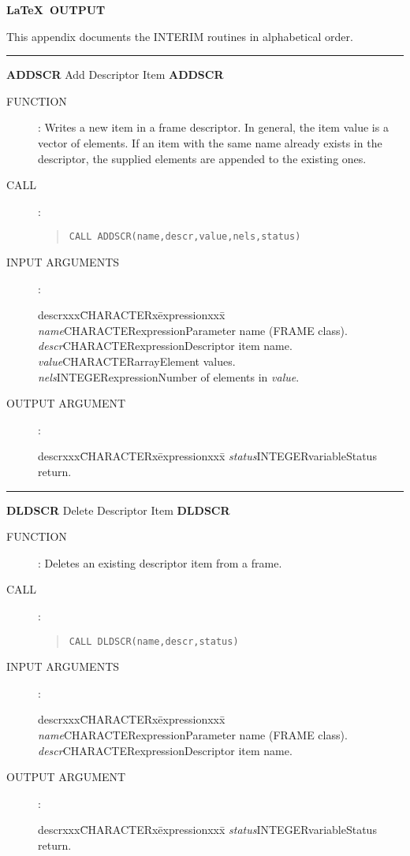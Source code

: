 \newpage

\begin{center}
{\bf \LaTeX\ OUTPUT}
\end{center}

This appendix documents the INTERIM routines in alphabetical order.\\
\rule{\textwidth}{0.3mm}
{\Large {\bf ADDSCR} \hfill Add Descriptor Item \hfill {\bf ADDSCR}}
\begin{description}
\item [FUNCTION]:
Writes a new item in a frame descriptor.
In general, the item value is a vector of elements.
If  an item with the same name already exists in the descriptor, the supplied
elements are appended to the existing ones.
\item [CALL]:
\begin{quote}
{\tt CALL ADDSCR(name,descr,value,nels,status)}
\end{quote}
\item [INPUT ARGUMENTS]:
\begin{tabbing}
descrxxx\=CHARACTERx\=expressionxxx\=\kill
{\em name}\>CHARACTER\>expression\>Parameter name (FRAME class).\\
{\em descr}\>CHARACTER\>expression\>Descriptor item name.\\
{\em value}\>CHARACTER\>array\>Element values.\\
{\em nels}\>INTEGER\>expression\>Number of elements in {\em value}.
\end{tabbing}
\item [OUTPUT ARGUMENT]:
\begin{tabbing}
descrxxx\=CHARACTERx\=expressionxxx\=\kill
{\em status}\>INTEGER\>variable\>Status return.
\end{tabbing}
\end{description}
\goodbreak
\rule{\textwidth}{0.3mm}
{\Large {\bf DLDSCR} \hfill Delete Descriptor Item \hfill {\bf DLDSCR}}
\begin{description}
\item [FUNCTION]:
Deletes an existing descriptor item from a frame.
\item [CALL]:
\begin{quote}
{\tt CALL DLDSCR(name,descr,status)}
\end{quote}
\item [INPUT ARGUMENTS]:
\begin{tabbing}
descrxxx\=CHARACTERx\=expressionxxx\=\kill
{\em name}\>CHARACTER\>expression\>Parameter name (FRAME class).\\
{\em descr}\>CHARACTER\>expression\>Descriptor item name.
\end{tabbing}
\item [OUTPUT ARGUMENT]:
\begin{tabbing}
descrxxx\=CHARACTERx\=expressionxxx\=\kill
{\em status}\>INTEGER\>variable\>Status return.
\end{tabbing}
\end{description}
\goodbreak

